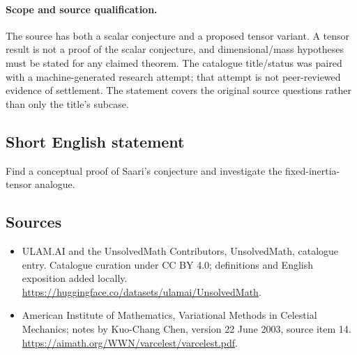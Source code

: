 \documentclass[11pt]{article}
\begin{document}
\paragraph{Scope and source qualification.}The source has both a scalar conjecture and a proposed tensor variant. A tensor result is not a proof of the scalar conjecture, and dimensional/mass hypotheses must be stated for any claimed theorem. The catalogue title/status was paired with a machine-generated research attempt; that attempt is not peer-reviewed evidence of settlement. The statement covers the original source questions rather than only the title’s subcase.
\subsection{Short English statement}
Find a conceptual proof of Saari’s conjecture and investigate the fixed-inertia-tensor analogue.
\subsection{Sources}
\begin{itemize}
\item[\hypertarget{source:statement:1}{S1}] ULAM.AI and the UnsolvedMath Contributors, UnsolvedMath, catalogue entry. Catalogue curation under CC BY 4.0; definitions and English exposition added locally.
\url{https://huggingface.co/datasets/ulamai/UnsolvedMath}.
\item[\hypertarget{source:statement:2}{S2}] American Institute of Mathematics, Variational Methods in Celestial Mechanics; notes by Kuo-Chang Chen, version 22 June 2003, source item 14.
\url{https://aimath.org/WWN/varcelest/varcelest.pdf}.
\end{itemize}
\label{end:statement}
\end{document}
